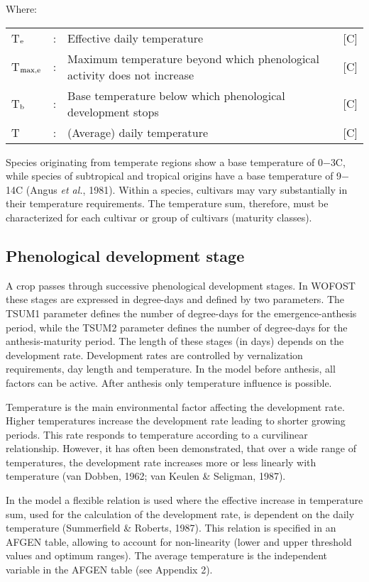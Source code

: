 Where:\\[5pt]
\begin{tabularx}{\textwidth}{llXr}
	T$_{{\rm e}}$ &:& Effective daily temperature & 
	[\textdegree C]\\
	T$_{{\rm max,e}}$ &:& Maximum temperature beyond which phenological 
	activity does not increase    &    [\textdegree C]\\
	T$_{{\rm b}}$ &:& Base temperature below which phenological development stops & 
	[\textdegree C]\\
	T  &:& (Average) daily temperature & [\textdegree C]
\end{tabularx}

Species originating from temperate regions show a base temperature of
0$-$3\textdegree C, while species of subtropical and tropical origins have a base temperature of
9$-$14\textdegree C (Angus {\it et al.}, 1981). Within a species, cultivars may vary substantially 
in their temperature requirements. The temperature sum, therefore, must be characterized for
each cultivar or group of cultivars (maturity classes).   

\subsection{Phenological development stage}
\label{sec:DVS}

A crop passes through successive phenological development stages. In WOFOST these stages 
are expressed in degree-days and defined by two parameters. The TSUM1 parameter defines
the number of degree-days for the emergence-anthesis period, while the TSUM2 parameter
defines the number of degree-days for the anthesis-maturity period. 
The length of these stages (in days) depends on the development rate. Development rates are 
controlled by vernalization requirements, day length and temperature. In the model before
anthesis, all factors can be active. After anthesis only temperature influence is possible.

Temperature is the main environmental factor affecting the development rate. Higher
temperatures increase the development rate leading to shorter growing periods. This rate
responds to temperature according to a curvilinear relationship. However, it has often
been demonstrated, that over a wide range of temperatures, the development rate
increases more or less linearly with temperature (van Dobben, 1962; van Keulen \&
Seligman, 1987).

In the model a flexible relation is used where the effective increase in temperature
sum, used for the calculation of the development rate, is dependent on the daily temperature 
(Summerfield \& Roberts, 1987). This relation is specified in an AFGEN table, 
allowing to account for non-linearity (lower and upper threshold values and optimum
ranges). The average temperature is the independent variable in the AFGEN table (see
Appendix 2). 

